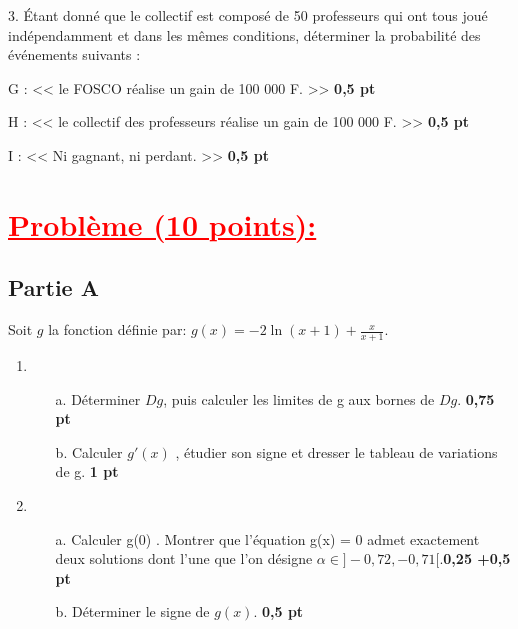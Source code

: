 \documentclass[12pt]{article}
\begin{document}
3. Étant donné que le collectif est composé de 50 professeurs qui ont tous joué indépendamment et dans les mêmes conditions, déterminer la probabilité des événements suivants :

G : << le FOSCO réalise un gain de 100 000 F. >> \textbf{0,5 pt}

H : << le collectif des professeurs réalise un gain de 100 000 F. >> \textbf{0,5 pt}

I : << Ni gagnant, ni perdant. >> \textbf{0,5 pt}
\section*{}
\section*{\textcolor{red}{\underline{Problème (10 points):}}}
\subsection*{Partie A}
Soit $g$ la fonction définie par: $g(x)=-2\ln(x+1)+\frac{x}{x+1}.$
\begin{enumerate}
\item 
\begin{enumerate}
\item[a.] Déterminer $Dg$, puis calculer les limites de g aux bornes de $Dg$. \textbf{0,75 pt}
\item[b.] Calculer $g'(x)$ , étudier son signe et dresser le tableau de variations de g. \textbf{1 pt}
\end{enumerate}
\item 
\begin{enumerate}
\item[a.] Calculer g(0) . Montrer que l’équation g(x) = 0 admet exactement deux solutions dont l’une que l’on désigne $\alpha \in ]-0,72, -0,71[.$\textbf{0,25 +0,5 pt}
\item[b.] Déterminer le signe de $g(x)$. \textbf{0,5 pt}
\end{enumerate}
\end{enumerate}
\end{document}
